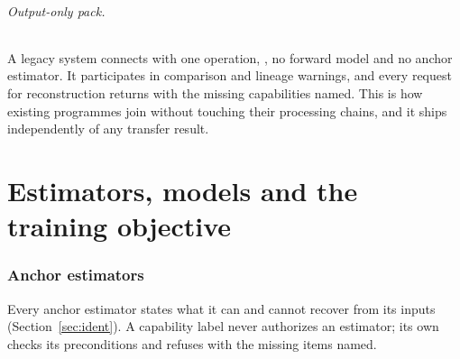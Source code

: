 \documentclass[11pt,a4paper]{article}
\begin{document}
\paragraph{Output-only pack.} A legacy system connects with one operation, , no forward model and no anchor estimator. It participates in comparison and lineage warnings, and every request for reconstruction returns  with the missing capabilities named. This is how existing programmes join without touching their processing chains, and it ships independently of any transfer result.

\part{Estimators, models and the training objective}

\section{Anchor estimators}

Every anchor estimator states what it can and cannot recover from its inputs (Section~\ref{sec:ident}). A capability label never authorizes an estimator; its own  checks its preconditions and refuses with the missing items named.
\end{document}
